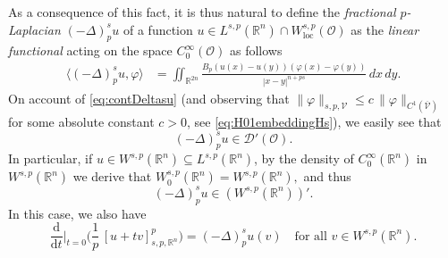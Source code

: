 \documentclass[11pt,a4paper]{amsart}
\def \R {\mathbb{R}}
\def \Oo {\mathcal{O}}
\theoremstyle{definition}
\theoremstyle{plain}
\numberwithin{equation}{section}
\begin{document}
 As a consequence of this fact, it is thus natural to define the 
\emph{fractional $p$-Lapla\-cian} $(-\Delta)_p^s u$
of a function $u\in {L}^{s,p}(\R^n)\cap W_{\mathrm{loc}}^{s,p}(\Oo)$ as the
\emph{linear functional} acting on the space $C_0^\infty(\Oo)$ as follows
\begin{equation} \label{eq:fractionalLapWeak}
\begin{split}
  \langle (-\Delta)^s_p u,\varphi\rangle & = 
 \iint_{\R^{2n}}\frac{B_p(u(x)-u(y))(\varphi(x)-\varphi(y))}{|x-y|^{n+ps}}\,dx\,dy.
 \end{split}
 \end{equation}
 On account of \eqref{eq:contDeltasu} (and observing that 
 $\|\varphi\|_{s,p,\mathcal{V}}
 \leq c\,\|\varphi\|_{C^1(\overline{\mathcal{V}})}$ for some absolute constant $c > 0$,
 see \eqref{eq:H01embeddingHs}),
 we easily see that 
$$(-\Delta)^s_p u\in\mathcal{D}'(\Oo).$$
 In particular, if $u\in W^{s,p}(\R^n)\subseteq L^{s,p}(\R^n)$,
 by the density of $C_0^\infty(\R^n)$
   in $W^{s,p}(\R^n)$ we derive that 
   $W_0^{s,p}(\R^n) = W^{s,p}(\R^n),$
   and thus
  $$(-\Delta)_p^s u\in (W^{s,p}(\R^n))'.$$ 
  In this case, we also have
  $$\frac{\mathrm{d}}{\mathrm{d}t}\Big|_{t = 0}
  \Big(\frac{1}{p}\,[u+tv]^p_{s,p,\R^n}\Big) = (-\Delta)_p^s u(v)\quad
  \text{for all $v\in W^{s,p}(\R^n)$}.$$
\end{document}

